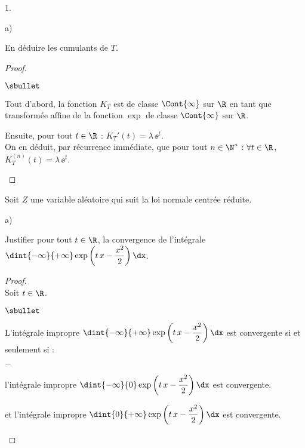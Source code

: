 \documentclass[11pt]{article}%
\begin{document}
\begin{noliste}{1.}
\begin{noliste}{a)}
  \item En déduire les cumulants de $T$.
    \begin{proof}~
      \begin{noliste}{$\sbullet$}
      \item Tout d'abord, la fonction $K_T$ est de classe
        $\Cont{\infty}$ sur $\R$ en tant que transformée affine de la
        fonction $\exp$ de classe $\Cont{\infty}$  sur $\R$.
        
      \item Ensuite, pour tout $t \in \R$ : $K_T'(t) = \lambda \,
        \ee^t$.\\
        On en déduit, par récurrence immédiate, que pour tout $n \in
        \N^*$ : $\forall t \in \R$, $K_T^{(n)}(t) = \lambda \, \ee^t$.
        ~\\[-1.4cm]
      \end{noliste}
    \end{proof}
  \end{noliste}


  \newpage
  


\item Soit $Z$ une variable aléatoire qui suit la loi normale centrée
  réduite.
  \begin{noliste}{a)}
    \setlength{\itemsep}{2mm}
  \item Justifier pour tout $t \in \R$, la convergence de l'intégrale
    $\dint{-\infty}{+\infty} \exp\left(t \, x - \dfrac{x^2}{2}\right)
    \dx$.
    
    \begin{proof}~\\%
      Soit $t \in \R$.
      \begin{noliste}{$\sbullet$}
      \item L'intégrale impropre $\dint{-\infty}{+\infty} \exp\left(t
          \, x - \dfrac{x^2}{2}\right) \dx$ est convergente si et
        seulement si :
        \begin{noliste}{$-$}
        \item l'intégrale impropre $\dint{-\infty}{0} \exp\left(t \, x
            - \dfrac{x^2}{2}\right) \dx$ est convergente.
        \item et l'intégrale impropre $\dint{0}{+\infty} \exp\left(t
            \, x - \dfrac{x^2}{2}\right) \dx$ est convergente.
        \end{noliste}
        

\end{noliste}
\end{proof}
\end{noliste}
\end{noliste}
\end{document}
